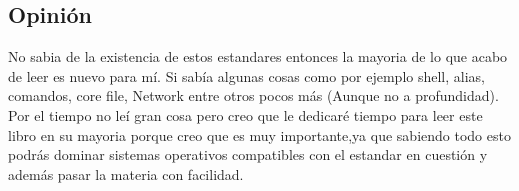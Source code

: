 \documentclass[11pt, a4paper]{report}
\begin{document}
\subsection*{Opini\'on}

No sabia de la existencia de estos estandares entonces la mayoria de lo que acabo de leer es nuevo para m\'i. Si sab\'ia algunas cosas como por ejemplo shell, alias, comandos, core file, Network entre otros pocos m\'as (Aunque no a profundidad). Por el tiempo no le\'i gran cosa pero creo que le dedicar\'e tiempo para leer este libro en su mayoria porque creo que es muy importante,ya que sabiendo todo esto podr\'as dominar 
sistemas operativos compatibles con el estandar en cuesti\'on y adem\'as pasar la materia con facilidad.
\end{document}
